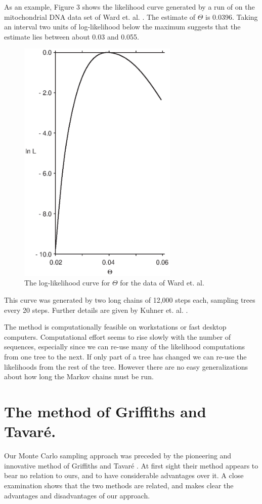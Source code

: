 As an example, Figure 3 shows the likelihood curve generated by a run of
on the mitochondrial DNA data set of Ward et. al. \cite{Ward91}.  The estimate of $\Theta$
is 0.0396.  Taking an interval two units of log-likelihood below the maximum
suggests that the estimate lies between about 0.03 and 0.055.
\begin{figure} %
\centerline{\includegraphics[width=3in]{fig3.ps}}
\caption{The log-likelihood curve for $\Theta$ for the data of Ward et. al.}
\end{figure}
This curve was generated by two long chains of 12,000 steps each, sampling
trees every 20 steps.  Further details are given by Kuhner et. al. \cite{Kuhner95}.

The method is computationally feasible on workstations or fast desktop
computers.  Computational effort seems to rise slowly with the number of
sequences, especially since we can re-use many of the likelihood computations
from one tree to the next.  If only part of a tree has changed we can
re-use the likelihoods from the rest of the tree.  However there are no
easy generalizations about how long the Markov chains must be run.

\section{The method of Griffiths and Tavar\'e.}

Our Monte Carlo sampling approach was preceded by the pioneering and
innovative method of
Griffiths and Tavar\'e \cite{GT94a, GT94b, GT94c}.  At first sight their method appears to
bear no relation to ours, and to have considerable advantages over it.
A close examination shows that the two methods are related, and makes
clear the advantages and disadvantages of our approach.

